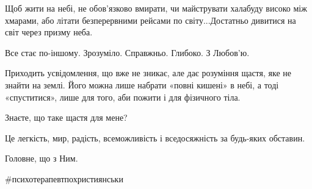 Щоб жити на небі, не обов'язково вмирати, чи майструвати халабуду високо між
хмарами, або літати безперервними рейсами по світу...Достатньо дивитися на світ
через призму неба. 

Все стає по-іншому. Зрозуміло. Справжньо. Глибоко. З Любов'ю. 

Приходить усвідомлення, що вже не зникає, але дає розуміння щастя, яке не
знайти на землі. Його можна лише набрати «повні кишені» в небі, а тоді
«спуститися», лише для того, аби пожити і для фізичного тіла. 

Знаєте, що таке щастя для мене?

Це легкість, мир, радість, всеможливість і вседосяжність за будь-яких обставин. 

Головне, що з Ним. 

\#психотерапевтпохристиянськи

